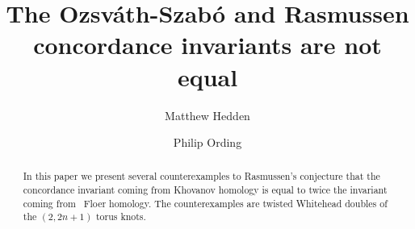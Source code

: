\documentclass[12pt]{amsart}
\title[{The Ozsv{\'a}th-Szab{\'o} and Rasmussen concordance invariants are not equal}] 
{The Ozsv{\'a}th-Szab{\'o} and Rasmussen concordance invariants are not equal}
\author[Matthew Hedden]{Matthew Hedden}
\author[Philip Ording]{Philip Ording}
\begin{document}
\begin{abstract}
In this paper we present several counterexamples to Rasmussen's conjecture that the concordance invariant coming from Khovanov homology is equal to twice the invariant coming from \os \ Floer homology.  The counterexamples are twisted Whitehead doubles of the $(2,2n+1)$ torus knots.
\end{abstract}






\commentable{


}
\end{document}
